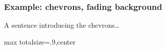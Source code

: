 
\begin{frame}
    \frametitle{Example: chevrons, fading background}

    \pgfmathsetmacro{}
    \pgfmathsetmacro{}
    \pgfmathsetmacro{}
    \pgfmathsetmacro{}
    \pgfmathsetmacro{}

    \begin{center}
        A sentence introducing the \alert{chevrons}\ldots
    \end{center}

    \vspace{1em}

    \begin{adjustbox}{max totalsize={.9\textwidth}{\textheight},center}
        
    \end{adjustbox}

\end{frame}
